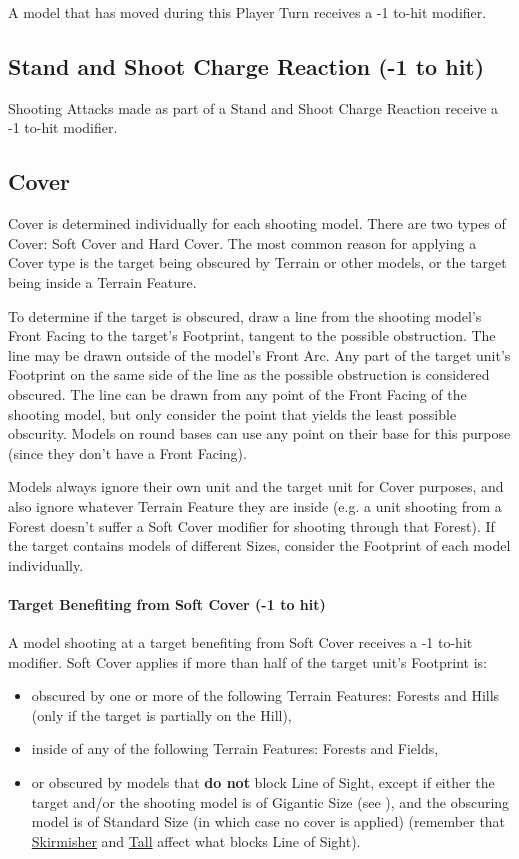 A model that has moved during this Player Turn receives a -1 to-hit modifier.

\subsection{Stand and Shoot Charge Reaction (-1 to hit)}
\label{stand_and_shoot_charge_reaction}

Shooting Attacks made as part of a Stand and Shoot Charge Reaction receive a -1 to-hit modifier.

\subsection{Cover}
\label{cover}

Cover is determined individually for each shooting model. There are two types of Cover: Soft Cover and Hard Cover. The most common reason for applying a Cover type is the target being obscured by Terrain or other models, or the target being inside a Terrain Feature.

To determine if the target is obscured, draw a line from the shooting model's Front Facing to the target's Footprint, tangent to the possible obstruction. The line may be drawn outside of the model's Front Arc. Any part of the target unit's Footprint on the same side of the line as the possible obstruction is considered obscured. The line can be drawn from any point of the Front Facing of the shooting model, but only consider the point that yields the least possible obscurity. Models on round bases can use any point on their base for this purpose (since they don't have a Front Facing).

Models always ignore their own unit and the target unit for Cover purposes, and also ignore whatever Terrain Feature they are inside (e.g. a unit shooting from a Forest doesn't suffer a Soft Cover modifier for shooting through that Forest). If the target contains models of different Sizes, consider the Footprint of each model individually.

\paragraph{Target Benefiting from Soft Cover (-1 to hit)}

A model shooting at a target benefiting from Soft Cover receives a -1 to-hit modifier. Soft Cover applies if more than half of the target unit's Footprint is: 
\begin{itemize}[label={-}]
\item obscured by one or more of the following Terrain Features: Forests and Hills (only if the target is partially on the Hill),
\item inside of any of the following Terrain Features: Forests and Fields,
\item or obscured by models that \textbf{do not} block Line of Sight, except if either the target and/or the shooting model is of Gigantic Size (see ), and the obscuring model is of Standard Size (in which case no cover is applied) (remember that \hyperref[skirmisher]{Skirmisher} and \hyperref[tall]{Tall} affect what blocks Line of Sight).
\end{itemize}

